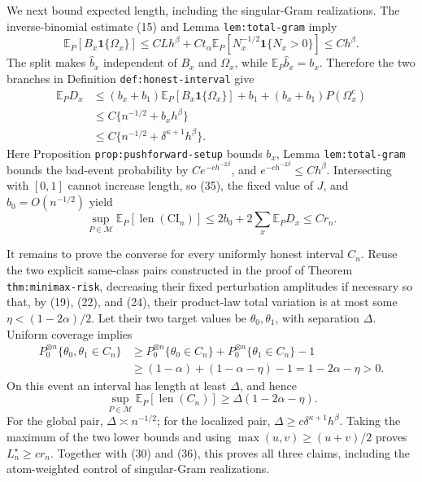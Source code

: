 We next bound expected length, including the singular-Gram realizations.  The inverse-binomial estimate (15) and Lemma \texttt{lem:total-gram} imply
\[
 \mathbb E_P[B_x\mathbf 1\{\Omega_x\}]
 \leq CLh^\beta+Ct_\alpha\mathbb E_P[N_x^{-1/2}\mathbf 1\{N_x>0\}]
 \leq Ch^\beta. \tag{34}
\]
The split makes \(\widehat b_x\) independent of \(B_x\) and \(\Omega_x\), while \(\mathbb E_P\widehat b_x=b_x\).  Therefore the two branches in Definition \texttt{def:honest-interval} give
\[
 \begin{aligned}
 \mathbb E_PD_x
 &\leq(b_x+b_1)\mathbb E_P[B_x\mathbf 1\{\Omega_x\}]+b_1
 +(b_x+b_1)P(\Omega_x^c)\\
 &\leq C\{n^{-1/2}+b_xh^\beta\}\\
 &\leq C\{n^{-1/2}+\delta^{\kappa+1}h^\beta\}. 
 \end{aligned} \tag{35}
\]
Here Proposition \texttt{prop:pushforward-setup} bounds \(b_x\), Lemma \texttt{lem:total-gram} bounds the bad-event probability by \(Ce^{-ch^{-2\beta}}\), and \(e^{-ch^{-2\beta}}\leq Ch^\beta\).  Intersecting with \([0,1]\) cannot increase length, so (35), the fixed value of \(J\), and \(b_0=O(n^{-1/2})\) yield
\[
 \sup_{P\in\mathcal M}\mathbb E_P[\operatorname{len}(\mathrm{CI}_n)]
 \leq2b_0+2\sum_x\mathbb E_PD_x
 \leq Cr_n. \tag{36}
\]

It remains to prove the converse for every uniformly honest interval \(C_n\).  Reuse the two explicit same-class pairs constructed in the proof of Theorem \texttt{thm:minimax-risk}, decreasing their fixed perturbation amplitudes if necessary so that, by (19), (22), and (24), their product-law total variation is at most some \(\eta<(1-2\alpha)/2\).  Let their two target values be \(\theta_0,\theta_1\), with separation \(\Delta\).  Uniform coverage implies
\[
 \begin{aligned}
 P_0^{\otimes n}\{\theta_0,\theta_1\in C_n\}
 &\geq P_0^{\otimes n}\{\theta_0\in C_n\}
   +P_0^{\otimes n}\{\theta_1\in C_n\}-1\\
 &\geq(1-\alpha)+(1-\alpha-\eta)-1
 =1-2\alpha-\eta>0. 
 \end{aligned} \tag{37}
\]
On this event an interval has length at least \(\Delta\), and hence
\[
 \sup_{P\in\mathcal M}\mathbb E_P[\operatorname{len}(C_n)]
 \geq \Delta(1-2\alpha-\eta). \tag{38}
\]
For the global pair, \(\Delta\asymp n^{-1/2}\); for the localized pair, \(\Delta\geq c\delta^{\kappa+1}h^\beta\).  Taking the maximum of the two lower bounds and using \(\max(u,v)\geq(u+v)/2\) proves \(L_n^\star\geq cr_n\).  Together with (30) and (36), this proves all three claims, including the atom-weighted control of singular-Gram realizations.